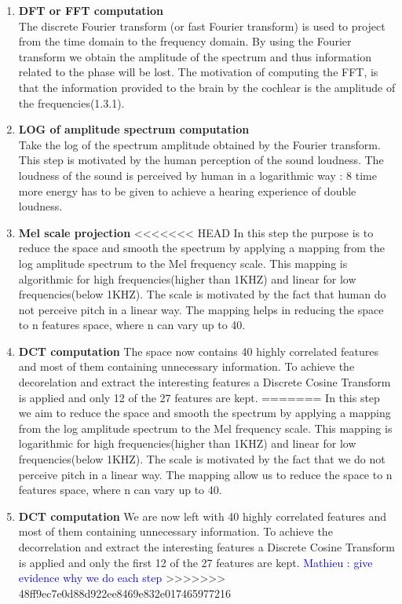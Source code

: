 \documentclass[hidelinks,12pt]{report}
\newcommand{\ml}[1]{\textcolor{blue}{ Mathieu : #1}}
\begin{document}
\begin{enumerate}
\item \textbf{DFT or FFT computation\\}
The discrete Fourier transform (or fast Fourier transform) is used to project from the time domain to the frequency domain. By using the Fourier transform we obtain the amplitude of the spectrum and thus  information related to the phase will be lost. The motivation of computing the FFT, is that the information provided to the brain by the cochlear is the amplitude of the frequencies(1.3.1).
\item \textbf{LOG of amplitude spectrum computation}\\
Take the log of the spectrum amplitude obtained by the Fourier transform. This step is motivated by the human perception of the sound loudness. The loudness of the sound is perceived by human in a logarithmic way : 8 time more energy has to be given to achieve a hearing experience of double loudness. 
\item \textbf{Mel scale projection}
<<<<<<< HEAD
In this step the purpose is to reduce the space and smooth the spectrum by applying a mapping from the log amplitude spectrum to the Mel frequency scale. This mapping is algorithmic for high frequencies(higher than 1KHZ) and linear for low frequencies(below 1KHZ). The scale is motivated by the fact that human do not perceive pitch in a linear way. The mapping helps in reducing the space to n features space, where n can vary up to 40.
\item \textbf{DCT computation}
The space now contains 40 highly correlated features and most of them containing unnecessary information. To achieve the decorelation and extract the interesting features a Discrete Cosine Transform is applied and only 12 of the 27 features are kept.
=======
In this step we aim to reduce the space and smooth the spectrum by applying a mapping from the log amplitude spectrum to the Mel frequency scale. This mapping is logarithmic for high frequencies(higher than 1KHZ) and linear for low frequencies(below 1KHZ). The scale is motivated by the fact that we do not perceive pitch in a linear way. The mapping allow us to reduce the space to n features space, where n can vary up to 40.
\item \textbf{DCT computation}
We are now left with 40 highly correlated features and most of them containing unnecessary information. To achieve the decorrelation and extract the interesting features a Discrete Cosine Transform is applied and only the first 12 of the 27 features are kept. \ml{give evidence why we do each step}
>>>>>>> 48ff9ec7e0d88d922ee8469e832e017465977216
\end{enumerate}
\end{document}

